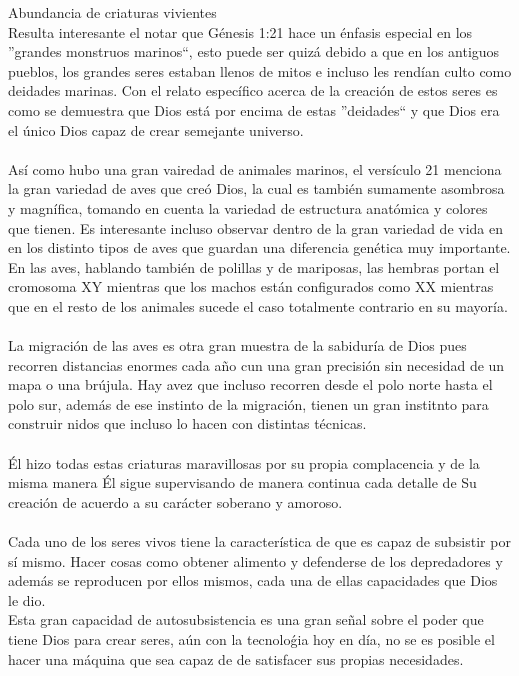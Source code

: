\begin{section}{Abundancia de criaturas vivientes}
\\
Resulta interesante el notar que Génesis 1:21 hace un énfasis especial en los ''grandes monstruos marinos``, esto puede ser quizá debido a que en los antiguos pueblos, los grandes seres estaban llenos de mitos e incluso les rendían culto como deidades marinas. Con el relato específico acerca de la creación de estos seres es como se demuestra que Dios está por encima de estas ''deidades`` y que Dios era el único Dios capaz de crear semejante universo.\\
\\
Así como hubo una gran vairedad de animales marinos, el versículo 21 menciona la gran variedad de aves que creó Dios, la cual es también sumamente asombrosa y magnífica, tomando en cuenta la variedad de estructura anatómica y colores que tienen.
\newpage
Es interesante incluso observar dentro de la gran variedad de vida en en los distinto tipos de aves que guardan una diferencia genética muy importante. En las aves, hablando también de polillas y de mariposas, las hembras portan el cromosoma XY mientras que los machos están configurados como XX mientras que en el resto de los animales sucede el caso totalmente contrario en su mayoría.\\
\\
La migración de las aves es otra gran muestra de la sabiduría de Dios pues recorren distancias enormes cada año cun una gran precisión sin necesidad de un mapa o una brújula. Hay avez que incluso recorren desde el polo norte hasta el polo sur, además de ese instinto de la migración, tienen un gran institnto para construir nidos que incluso lo hacen con distintas técnicas.\\
\\
Él hizo todas estas criaturas maravillosas por su propia complacencia y de la misma manera Él sigue supervisando de manera continua cada detalle de Su creación de acuerdo a su carácter soberano y amoroso.\\
\\
Cada uno de los seres vivos tiene la característica de que es capaz de subsistir por sí mismo. Hacer cosas como obtener alimento y defenderse de los depredadores y además se reproducen por ellos mismos, cada una de ellas capacidades que Dios le dio.\\
Esta gran capacidad de autosubsistencia es una gran señal sobre el poder que tiene Dios para crear seres, aún con la tecnoloǵia hoy en día, no se es posible el hacer una máquina que sea capaz de de satisfacer sus propias necesidades.\\

\end{section}
